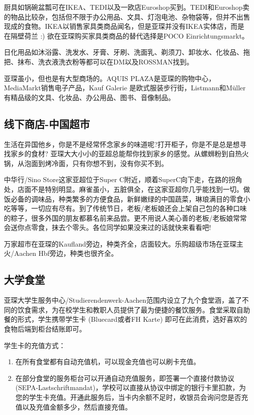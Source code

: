     厨具如锅碗盆瓢可在IKEA、TEDI以及一欧店Euroshop买到。TEDI和Euroshop卖的物品比较杂，包括但不限于办公用品、文具、灯泡电池、杂物袋等，但并不出售现成的食物。IKEA以销售家具类商品闻名，但是亚琛并没有IKEA实体店，而是在隔壁荷兰 :) 欲在亚琛购买家具类商品的替代选择是POCO Einrichtungsmarkt。

    日化用品如沐浴露、洗发水、牙膏、牙刷、洗面乳、剃须刀、卸妆水、化妆品、拖把、抹布、洗衣液洗衣粉等都可以在DM以及ROSSMAN找到。

    亚琛虽小，但也是有大型商场的。AQUIS PLAZA是亚琛的购物中心，MediaMarkt销售电子产品，Kauf Galerie 是欧式服装步行街，Listmann和Müller有精品级的文具、化妆品、办公用品、图书、音像制品。

  \subsection{线下商店-中国超市}\label{subsec:线下商店-中国超市}

    生活在异国他乡，你是不是经常怀念家乡的味道呢?打开柜子，你是不是总是想寻找家乡的食材? 亚琛大大小小的亚超总能帮你找到家乡的感觉。从螺蛳粉到自热火锅，从泡面到烤冷面，只有你想不到，没有你买不到。

    中华行/Sino Store这家亚超位于Super C附近，顺着SuperC向下走，在路的拐角处，店面不是特别明显。麻雀虽小，五脏俱全，在这家亚超你几乎能找到一切。做饭必备的调味品，种类繁多的方便食品，新鲜嫩绿的中国蔬菜，琳琅满目的零食小吃等等，一切应有尽有。到了传统节日，老板/老板娘还会上架自己包的各种口味的粽子，很多外国的朋友都慕名前来品尝。更不用说人美心善的老板/老板娘常常会送你点零食，抹去个零头。各位同学如果没来过的话就快来看看吧!

    万家超市在亚琛的Kaufland旁边，种类齐全，店面较大。乐购超级市场在亚琛主火/Aachen Hbf旁边，种类也很齐全。

  \subsection{大学食堂}\label{subsec:大学食堂}

    亚琛大学生服务中心/Studierendenwerk-Aachen范围内设立了九个食堂涵，盖了不同的饮食需求，为在校学生和教职人员提供了最为便捷的餐饮服务。食堂采取自助餐的形式，学生携带学生卡 (Bluecard或者FH Karte) 即可在此消费，选好喜欢的食物后端到柜台结账即可。

    学生卡的充值方式：

    \begin{enumerate}
      \item 在所有食堂都有自动充值机，可以现金充值也可以刷卡充值。
      \item 在部分食堂的服务柜台可以开通自动充值服务，即签署一个直接付款协议 (SEPA-Lastschriftmandat)，学校可以直接从协议中绑定的银行卡里扣款，为您的学生卡充值。开通此服务后，当卡内余额不足时，收银员会询问您是否充值以及充值金额多少，然后直接充值。
    \end{enumerate}


